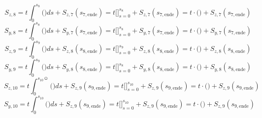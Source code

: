 \begin{itemize}
\begin{equation}
\end{equation}
\begin{equation}
	S_{z,8} = t\int_{0}^{s_8}\bigg(\bigg)ds + S_{z,7}(s_{7,\mathrm{ende}}) = t\bigg[\bigg]_{s=0}^{s_8} + S_{z,7}(s_{7,\mathrm{ende}}) = t\cdot\bigg(\bigg) + S_{z,7}(s_{7,\mathrm{ende}})
\end{equation}
\begin{equation}
	S_{y,8} = t\int_{0}^{s_8}\bigg(\bigg)ds + S_{y,7}(s_{7,\mathrm{ende}}) = t\bigg[\bigg]_{s=0}^{s_8} + S_{y,7}(s_{7,\mathrm{ende}}) = t\cdot\bigg(\bigg) + S_{y,7}(s_{7,\mathrm{ende}})
\end{equation}
\begin{equation}
	S_{z,9} = t\int_{0}^{s_9}\bigg(\bigg)ds + S_{z,8}(s_{8,\mathrm{ende}}) = t\bigg[\bigg]_{s=0}^{s_9} + S_{z,8}(s_{8,\mathrm{ende}}) = t\cdot\bigg(\bigg) + S_{z,8}(s_{8,\mathrm{ende}})
\end{equation}
\begin{equation}
	S_{y,9} = t\int_{0}^{s_9}\bigg(\bigg)ds + S_{y,8}(s_{8,\mathrm{ende}}) = t\bigg[\bigg]_{s=0}^{s_8} + S_{y,8}(s_{8,\mathrm{ende}}) = t\cdot\bigg(\bigg) + S_{y,8}(s_{8,\mathrm{ende}})
\end{equation}
\begin{equation}
	S_{z,10} = t\int_{0}^{s_{10}☺}\bigg(\bigg)ds + S_{z,9}(s_{9,\mathrm{ende}}) = t\bigg[\bigg]_{s=0}^{s_10} + S_{z,9}(s_{9,\mathrm{ende}}) = t\cdot\bigg(\bigg) + S_{z,9}(s_{9,\mathrm{ende}})
\end{equation}
\begin{equation}
	S_{y,10} = t\int_{0}^{s_{10}}\bigg(\bigg)ds + S_{z,9}(s_{9,\mathrm{ende}}) = t\bigg[\bigg]_{s=0}^{s_{10}} + S_{z,9}(s_{9,\mathrm{ende}}) = t\cdot\bigg(\bigg) + S_{z,9}(s_{9,\mathrm{ende}})
\end{equation}
\end{itemize}
\newpage
